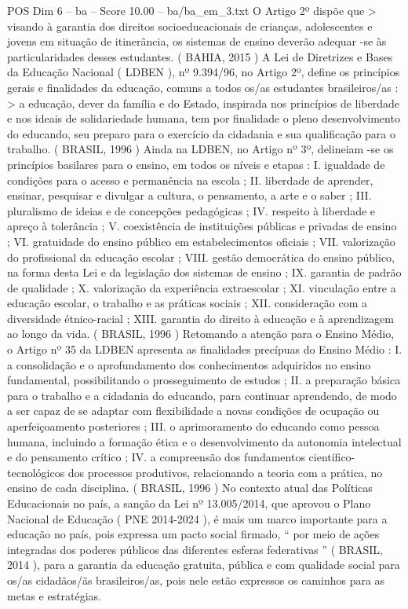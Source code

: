 \begin{textsample}{POS Dim 6 – ba – Score 10.00 – ba/ba\_em\_3.txt}
O Artigo 2º dispõe que > visando à garantia dos direitos socioeducacionais de crianças, adolescentes e jovens em situação de itinerância, os sistemas de ensino deverão adequar -se às particularidades desses estudantes. ( BAHIA, 2015 ) A Lei de Diretrizes e Bases da Educação Nacional ( LDBEN ), nº 9.394/96, no Artigo 2º, define os princípios gerais e finalidades da educação, comuns a todos os/as estudantes brasileiros/as : > a educação, dever da família e do Estado, inspirada nos princípios de liberdade e nos ideais de solidariedade humana, tem por finalidade o pleno desenvolvimento do educando, seu preparo para o exercício da cidadania e sua qualificação para o trabalho. ( BRASIL, 1996 ) Ainda na LDBEN, no Artigo nº 3º, delineiam -se os princípios basilares para o ensino, em todos os níveis e etapas : I. igualdade de condições para o acesso e permanência na escola ; II. liberdade de aprender, ensinar, pesquisar e divulgar a cultura, o pensamento, a arte e o saber ; III. pluralismo de ideias e de concepções pedagógicas ; IV. respeito à liberdade e apreço à tolerância ; V. coexistência de instituições públicas e privadas de ensino ; VI. gratuidade do ensino público em estabelecimentos oficiais ; VII. valorização do profissional da educação escolar ; VIII. gestão democrática do ensino público, na forma desta Lei e da legislação dos sistemas de ensino ; IX. garantia de padrão de qualidade ; X. valorização da experiência extraescolar ; XI. vinculação entre a educação escolar, o trabalho e as práticas sociais ; XII. consideração com a diversidade étnico-racial ; XIII. garantia do direito à educação e à aprendizagem ao longo da vida. ( BRASIL, 1996 ) Retomando a atenção para o Ensino Médio, o Artigo nº 35 da LDBEN apresenta as finalidades precípuas do Ensino Médio : I. a consolidação e o aprofundamento dos conhecimentos adquiridos no ensino fundamental, possibilitando o prosseguimento de estudos ; II. a preparação básica para o trabalho e a cidadania do educando, para continuar aprendendo, de modo a ser capaz de se adaptar com flexibilidade a novas condições de ocupação ou aperfeiçoamento posteriores ; III. o aprimoramento do educando como pessoa humana, incluindo a formação ética e o desenvolvimento da autonomia intelectual e do pensamento crítico ; IV. a compreensão dos fundamentos científico-tecnológicos dos processos produtivos, relacionando a teoria com a prática, no ensino de cada disciplina. ( BRASIL, 1996 ) No contexto atual das Políticas Educacionais no país, a sanção da Lei nº 13.005/2014, que aprovou o Plano Nacional de Educação ( PNE 2014-2024 ), é mais um marco importante para a educação no país, pois expressa um pacto social firmado, “ por meio de ações integradas dos poderes públicos das diferentes esferas federativas ” ( BRASIL, 2014 ), para a garantia da educação gratuita, pública e com qualidade social para os/as cidadãos/ãs brasileiros/as, pois nele estão expressos os caminhos para as metas e estratégias.

\end{textsample}
